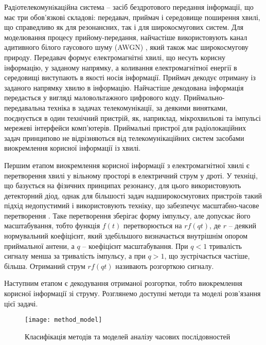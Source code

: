 Радiотелекомунiкацiйна система -- засіб бездротового передання інформації, що 
має три обов'язкові складові: передавач, приймач і середовище поширення 
хвилі, що справедливо як для резонансних, так і для широкосмугових систем.
Для моделювання процесу прийому-передання, найчастіше використовують 
канал адитивного білого гаусового шуму (AWGN) 
\cite{imp:Lazorenko2009}, який також має широкосмугову природу.
Передавач формує електромагнітні хвилі,  що несуть корисну інформацію, у 
заданому напрямку, а коливання електромагнітної енергії в середовищі 
виступають в якості носія інформації.  Приймач декодує 
отриману із заданого напрямку хвилю в інформацію. Найчастіше декодована 
інформація передасться у вигляді маловольтажного цифрового коду. 
Приймально-передавальна техніка в задачах телекомунікації, за деякими 
винятками, поєднується в один технічний пристрій, як, наприклад, 
мікрохвильові та імпульсі мережеві інтерфейси комп'ютерів. Приймальні 
пристрої для радіолокаційних задач принципово не відрізняються від 
телекомунікаційних систем засобами виокремлення корисної інформації 
із хвилі.


Першим етапом виокремлення корисної інформації з електромагнітної хвилі є 
перетворення хвилі у вільному просторі в електричний струм у дроті. У техніці, 
що базується на фізичних принципах резонансу, для цього використовують 
детекторний діод, однак для більшості задач надширокосмугових пристроїв 
такий підхід недопустимий і використовують техніку, що забезпечує 
масштабно-часове перетворення
\cite{imp:Lazorenko2009}. Таке перетворення зберігає форму імпульсу, але 
допускає його масштабування, тобто функція $ f(t) $ перетворюється на 
$ r f(qt) $, де $ r $ -- деякий нормувальний коефіцієнт, який здебільшого 
визначається внутрішнім опором приймальної антени, а $ q $ -- коефіцієнт 
масштабування. При $ q < 1 $ тривалість сигналу менша за тривалість імпульсу, 
а при $ q > 1 $, що зустрічається частіше, більша. Отриманий струм 
$ r f(qt) $ називають розгорткою сигналу.

Наступним етапом є декодування отриманої розгортки, 
тобто виокремлення корисної інформації зі струму. 
Розглянемо доступні методи та моделі розв'язання цієї задачі.

\begin{figure}[htbp] \begin{center}
\texttt{[image: method\_model]}
\caption{Класифікація методів та моделей аналізу часових послідовностей} 
\label{fig:method_model}
\end{center} \end{figure}

